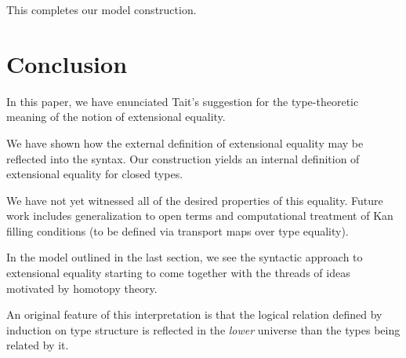 \documentclass[10pt]{article}
\begin{document}
This completes our model construction.

\section{Conclusion}

In this paper, we have enunciated Tait's suggestion for the
type-theoretic meaning of the notion of extensional equality.

We have shown how the external definition of extensional equality may
be reflected into the syntax.  Our construction yields an internal
definition of extensional equality for closed types.

We have not yet witnessed all of the desired properties of this
equality.  Future work includes generalization to open terms and
computational treatment of Kan filling conditions (to be defined via
transport maps over type equality).

In the model outlined in the last section, we see the syntactic
approach to extensional equality starting to come together
with the threads of ideas motivated by homotopy theory.

An original feature of this interpretation is that the logical
relation defined by induction on type structure is reflected in the
\emph{lower} universe than the types being related by it.


\setlength{\voffset}{0cm}
\end{document}
